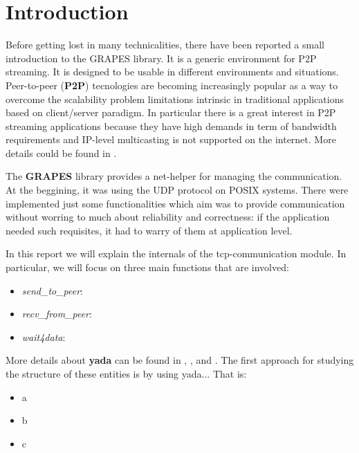 \section{Introduction}
\label{ch:intro}
Before getting lost in many technicalities, there have been reported a small
introduction to the GRAPES library. It is a generic environment for P2P
streaming. It is designed to be usable in different environments and
situations. Peer-to-peer (\textbf{P2P}) tecnologies are becoming increasingly
popular as a way to overcome the scalability problem limitations intrinsic in
traditional applications based on client/server paradigm. In particular there
is a great interest in P2P streaming applications because they have high
demands in term of bandwidth requirements and IP-level multicasting is not
supported on the internet.
More details could be found in \cite{disi10-038}.

The \textbf{GRAPES} library provides a net-helper for managing the
communication. At the beggining, it was using the UDP protocol on POSIX
systems. There were implemented just some functionalities which aim was to
provide communication without worring to much about reliability and
correctness: if the application needed such requisites, it had to warry of
them at application level. %

In this report we will explain the internals of the tcp-communication module.
In particular, we will focus on three main functions that are involved:
\begin{itemize}
  \item \textit{send_to_peer}:
  \item \textit{recv_from_peer}:
  \item \textit{wait4data}:
\end{itemize}
More details about \textbf{yada} can be found in \cite{yada1}, \cite{yada2},
\cite{yada3} and \cite{yada4}.
The first approach for studying the structure of these entities is by using
yada...
That is:
\begin{itemize}
\item a
\item b
\item c
\end{itemize}
